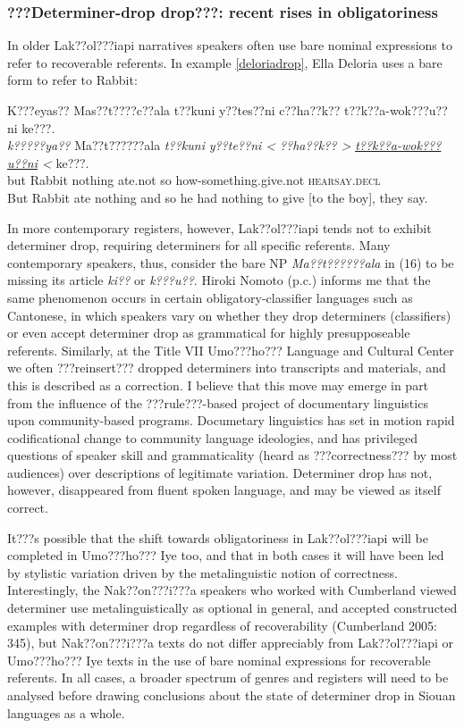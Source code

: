 \documentclass[output=paper]{LSP/langsci}
\begin{document}
\subsubsection{???Determiner-drop drop???: recent rises in obligatoriness}\label{determinerdropdrop}

	In older Lak??ol???iapi narratives speakers often use bare nominal expressions to refer to recoverable referents. In example \ref{deloriadrop}, Ella Deloria uses a bare form to refer to Rabbit:
	
\ea\label{deloriadrop}
	K???eyas?? Mas??t????c??ala t??kuni y??tes??ni c??ha??k?? t??k??a-wok???u??ni ke???.\footnotemark\\
\gll	\emph{k?????ya??} 	Ma??t??????ala 	\emph{t??kuni} 	\emph{y??te??ni <}	 \emph{??ha??k?? >} 	\emph{\underline{t??k??a-wok???u??ni} <}		ke???. \\
	but 			Rabbit		nothing	 	ate.not	 	 so 			 how-something.give.not 				\textsc{hearsay.decl}\\
\glt	But Rabbit ate nothing and so he had nothing to give [to the boy], they say.
\z

In more contemporary registers, however, Lak??ol???iapi tends not to exhibit determiner drop, requiring determiners for all specific referents. Many contemporary speakers, thus, consider the bare NP \emph{Ma??t??????ala} in (16) to be missing its article \emph{ki??} or \emph{k???u??}. Hiroki Nomoto (p.c.) informs me that the same phenomenon occurs in certain obligatory-classifier languages such as Cantonese, in which speakers vary on whether they drop determiners (classifiers) or even accept determiner drop as grammatical for highly presupposeable referents. Similarly, at the Title VII Umo???ho??? Language and Cultural Center we often ???reinsert??? dropped determiners into transcripts and materials, and this is described as a correction. I believe that this move may emerge in part from the influence of the ???rule???-based project of documentary linguistics upon community-based programs. Documetary linguistics has set in motion rapid codificational change to community language ideologies, and has privileged questions of speaker skill and grammaticality (heard as ???correctness??? by most audiences) over descriptions of legitimate variation. Determiner drop has not, however, disappeared from fluent spoken language, and may be viewed as itself correct.

	It???s possible that the shift towards obligatoriness in Lak??ol???iapi will be completed in Umo???ho??? Iye too, and that in both cases it will have been led by stylistic variation driven by the metalinguistic notion of correctness. Interestingly, the Nak??on???i???a speakers who worked with Cumberland viewed determiner use metalinguistically as optional in general, and accepted constructed examples with determiner drop regardless of recoverability (Cumberland 2005: 345), but Nak??on???i???a texts do not differ appreciably from Lak??ol???iapi or Umo???ho??? Iye texts in the use of bare nominal expressions for recoverable referents. In all cases, a broader spectrum of genres and registers will need to be analysed before drawing conclusions about the state of determiner drop in Siouan languages as a whole.
\end{document}

